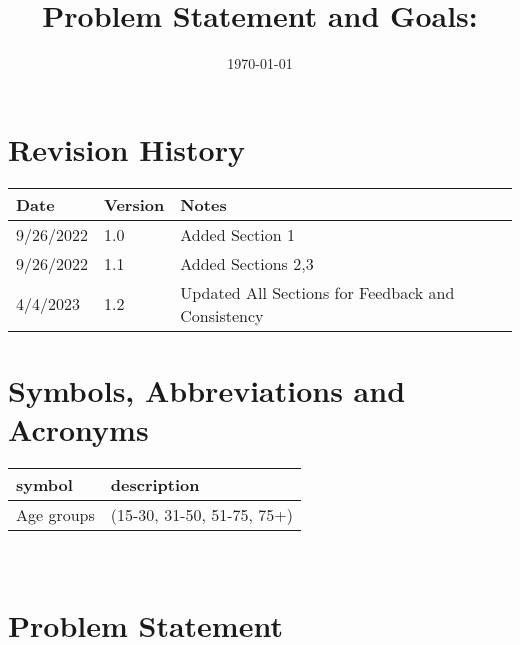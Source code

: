 \documentclass[12pt, titlepage]{article}
\begin{document}
\title{Problem Statement and Goals: \progname} 
\author{\authname}
\date{\today}

\maketitle


\section*{Revision History}

\begin{tabularx}{\textwidth}{p{3cm}p{2cm}X}
\toprule {\bf Date} & {\bf Version} & {\bf Notes}\\
\midrule
9/26/2022 & 1.0 & Added Section 1\\
9/26/2022 & 1.1 & Added Sections 2,3\\
4/4/2023 & 1.2 & Updated All Sections for Feedback and Consistency\\
\bottomrule
\end{tabularx}

\newpage

\tableofcontents

\listoffigures

\listoftables

\newpage

\section*{Symbols, Abbreviations and Acronyms}

\renewcommand{\arraystretch}{1.2}
\begin{tabular}{l l} 
  \toprule		
  \textbf{symbol} & \textbf{description}\\
  \midrule 
  Age groups & (15-30, 31-50, 51-75, 75+)\\
  \bottomrule
\end{tabular}\\

\newpage


\section{Problem Statement}
\end{document}
